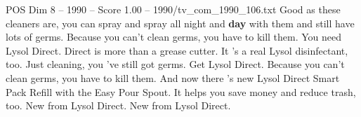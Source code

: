 \begin{textsample}{POS Dim 8 – 1990 – Score 1.00 – 1990/tv\_com\_1990\_106.txt}  \label{ex:f8_pos_072}
Good as these cleaners are, you can spray and spray all night and \textbf{day} with them and still have lots of germs.
Because you can't clean germs, you have to kill them.
You need Lysol Direct.
Direct is more than a grease cutter.
It 's a real Lysol disinfectant, too.
Just cleaning, you 've still got germs.
Get Lysol Direct.
Because you can't clean germs, you have to kill them.
And now there 's new Lysol Direct Smart Pack Refill with the Easy Pour Spout.
It helps you save money and reduce trash, too.
New from Lysol Direct.
New from Lysol Direct.

\end{textsample}
